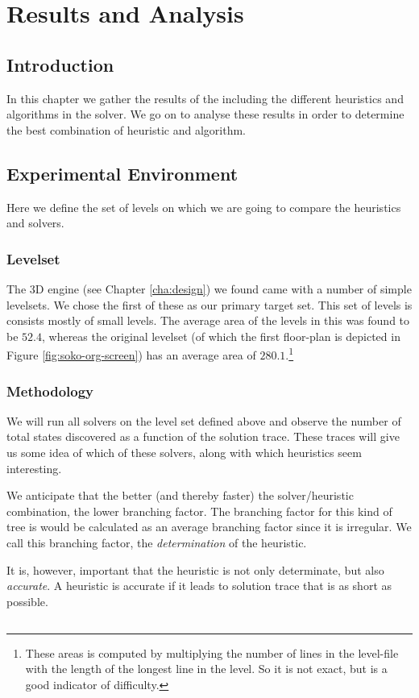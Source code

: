 \chapter{Results and Analysis}
\label{cha:analysis}

\section{Introduction}
In this chapter we gather the results of the including the different
heuristics and algorithms in the solver. We go on to analyse these
results in order to determine the best combination of heuristic and
algorithm.

\section{Experimental Environment}
Here we define the set of levels on which we are going to compare the
heuristics and solvers. 

\subsection{Levelset}
The 3D engine (see Chapter \ref{cha:design}) we found came with a
number of simple levelsets. We chose the first of these as our primary
target set. This set of levels is consists mostly of small levels. The
average area of the levels in this was found to be $52.4$, whereas the
original levelset (of which the first floor-plan is depicted in Figure
\ref{fig:soko-org-screen}) has an average area of
$280.1$.\footnote{These areas is computed by multiplying the number of
  lines in the level-file with the length of the longest line in the
  level. So it is not exact, but is a good indicator of difficulty.}


\subsection{Methodology}
We will run all solvers on the level set defined above and observe the
number of total states discovered as a function of the solution trace.
These traces will give us some idea of which of these solvers, along
with which heuristics seem interesting.

We anticipate that the better (and thereby faster) the
solver/heuristic combination, the lower branching factor. The
branching factor for this kind of tree is would be calculated as an
average branching factor since it is irregular. We call this branching
factor, the \emph{determination} of the heuristic.

It is, however, important that the heuristic is not only determinate,
but also \emph{accurate}. A heuristic is accurate if it leads to
solution trace that is as short as possible.

\section{}





